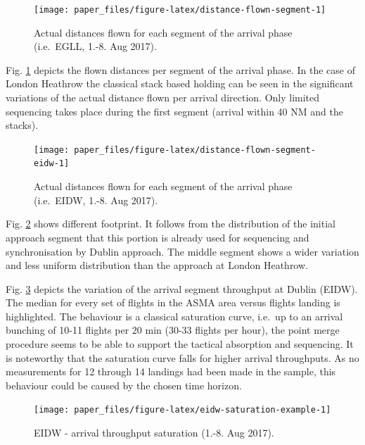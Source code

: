 \documentclass[conference,final,a4paper,]{IEEEtran}
\begin{document}
\begin{figure}[H]

{\centering \texttt{[image: paper\_files/figure-latex/distance-flown-segment-1]} 

}

\caption{Actual distances flown for each segment of the arrival phase (i.e.~EGLL, 1.-8. Aug 2017).}\label{fig:distance-flown-segment}
\end{figure}

Fig. \ref{fig:distance-flown-segment} depicts the flown distances per segment of the arrival phase.
In the case of London Heathrow the classical stack based holding can be seen in the significant variations of the actual distance flown per arrival direction.
Only limited sequencing takes place during the first segment (arrival within 40 NM and the stacks).



\begin{figure}[H]

{\centering \texttt{[image: paper\_files/figure-latex/distance-flown-segment-eidw-1]} 

}

\caption{Actual distances flown for each segment of the arrival phase (i.e.~EIDW, 1.-8. Aug 2017).}\label{fig:distance-flown-segment-eidw}
\end{figure}

Fig. \ref{fig:distance-flown-segment-eidw} shows different footprint. It follows from the distribution of the initial approach segment that this portion is already used for sequencing and synchronisation by Dublin approach.
The middle segment shows a wider variation and less uniform distribution than the approach at London Heathrow.

Fig. \ref{fig:eidw-saturation-example} depicts the variation of the arrival segment throughput at Dublin (EIDW).
The median for every set of flights in the ASMA area versus flights landing is highlighted.
The behaviour is a classical saturation curve, i.e.~up to an arrival bunching of 10-11 flights per 20 min (30-33 flights per hour), the point merge procedure seems to be able to support the tactical absorption and sequencing.
It is noteworthy that the saturation curve falls for higher arrival throughputs. As no measurements for 12 through 14 landings had been made in the sample, this behaviour could be caused by the chosen time horizon.



\begin{figure}[hb]

{\centering \texttt{[image: paper\_files/figure-latex/eidw-saturation-example-1]} 

}

\caption{EIDW - arrival throughput saturation (1.-8. Aug 2017).}\label{fig:eidw-saturation-example}
\end{figure}
\end{document}
